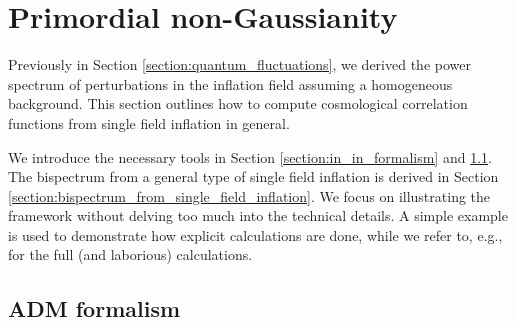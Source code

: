 \section{Primordial non-Gaussianity} \label{section:primordial_non_Gaussianity}

Previously in Section \ref{section:quantum_fluctuations}, we derived the power spectrum of perturbations in the inflation field assuming a homogeneous background. This section outlines how to compute cosmological correlation functions from single field inflation in general.

We introduce the necessary tools in Section \ref{section:in_in_formalism} and \ref{section:ADM_formalism}. The bispectrum from a general type of single field inflation is derived in Section \ref{section:bispectrum_from_single_field_inflation}. We focus on illustrating the framework without delving too much into the technical details. A simple example is used to demonstrate how explicit calculations are done, while we refer to, e.g., \cite{Maldacena2013,Chen2010review,Burrage2011large} for the full (and laborious) calculations.

\subsection{ADM formalism} \label{section:ADM_formalism}

